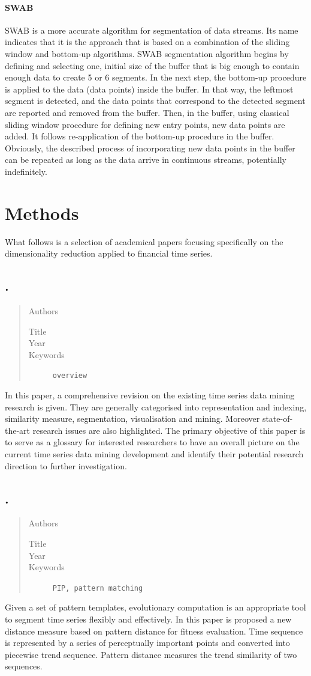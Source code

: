 \documentclass[a4paper]{article}
\newcommand{\newpaper}[2]{\subsection*{\cite{#1}. \citetitle{#1}}

\begin{framed}\begin{quote}\begin{description}
	\item [Authors]\citeauthor{#1}
	\item [Title]\citetitle{#1}
	\item [Year]\citedate{#1}
	\item [Keywords]\texttt{#2}
\end{description}\end{quote}\end{framed}}
\begin{document}
\paragraph{SWAB} SWAB is a more accurate algorithm for segmentation of data streams. Its name indicates that it is the approach that is based on a combination of the sliding window and bottom-up algorithms. SWAB segmentation algorithm begins by defining and selecting one, initial size of the buffer that is big enough to contain enough data to create 5 or 6 segments. In the next step, the bottom-up procedure is applied to the data (data points) inside the buffer. In that way, the leftmost segment is detected, and the data points that correspond to the detected segment are reported and removed from the buffer. Then, in the buffer, using classical sliding window procedure for defining new entry points, new data points are added. It follows re-application of the bottom-up procedure in the buffer. Obviously, the described process of incorporating new data points in the buffer can be repeated as long as the data arrive in continuous streams, potentially indefinitely. 





\section{Methods}\label{sec:methods}
 
What follows is a selection of academical papers focusing specifically on the dimensionality reduction applied to financial time series. 


\newpaper{Fu2011164}{overview}
In this paper, a comprehensive revision on the existing time series data mining research is given. They are generally categorised into representation and indexing, similarity measure, segmentation, visualisation and mining. Moreover state-of-the-art research issues are also highlighted. The primary objective of this paper is to serve as a glossary for interested researchers to have an overall picture on the current time series data mining development and identify their potential research direction to further investigation. 


\newpaper{Yu2006}{PIP, pattern matching} 

Given a set of pattern templates, evolutionary computation is an appropriate tool to segment time series flexibly and effectively. In this paper is proposed a new distance measure based on pattern distance for fitness evaluation. Time sequence is represented by a series of perceptually important points and converted into piecewise trend sequence. Pattern distance measures the trend similarity of two sequences.
\end{document}
